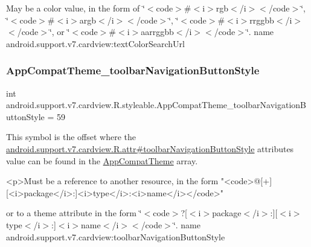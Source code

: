 May be a color value, in the form of \char`\"{}$<$code$>$\#$<$i$>$rgb$<$/i$>$$<$/code$>$\char`\"{}, \char`\"{}$<$code$>$\#$<$i$>$argb$<$/i$>$$<$/code$>$\char`\"{}, \char`\"{}$<$code$>$\#$<$i$>$rrggbb$<$/i$>$$<$/code$>$\char`\"{}, or \char`\"{}$<$code$>$\#$<$i$>$aarrggbb$<$/i$>$$<$/code$>$\char`\"{}.  name android.\+support.\+v7.\+cardview\+:text\+Color\+Search\+Url \mbox{\label{classandroid_1_1support_1_1v7_1_1cardview_1_1R_1_1styleable_a6ccca53fe196080e3926237eed8f3b67}} 
\subsubsection{\texorpdfstring{App\+Compat\+Theme\+\_\+toolbar\+Navigation\+Button\+Style}{AppCompatTheme\_toolbarNavigationButtonStyle}}
{\footnotesize\ttfamily int android.\+support.\+v7.\+cardview.\+R.\+styleable.\+App\+Compat\+Theme\+\_\+toolbar\+Navigation\+Button\+Style = 59\hspace{0.3cm}{\ttfamily [static]}}

This symbol is the offset where the \hyperlink{classandroid_1_1support_1_1v7_1_1cardview_1_1R_1_1attr_ae9cf75ca8aefa0117e4e6fddd9c56df2}{android.\+support.\+v7.\+cardview.\+R.\+attr\#toolbar\+Navigation\+Button\+Style} attribute\textquotesingle{}s value can be found in the \hyperlink{classandroid_1_1support_1_1v7_1_1cardview_1_1R_1_1styleable_a52e6f69f954ecc2622d72c0b4d298938}{App\+Compat\+Theme} array.

\begin{DoxyVerb}      <p>Must be a reference to another resource, in the form "<code>@[+][<i>package</i>:]<i>type</i>:<i>name</i></code>"
\end{DoxyVerb}
 or to a theme attribute in the form \char`\"{}$<$code$>$?\mbox{[}$<$i$>$package$<$/i$>$\+:\mbox{]}\mbox{[}$<$i$>$type$<$/i$>$\+:\mbox{]}$<$i$>$name$<$/i$>$$<$/code$>$\char`\"{}.  name android.\+support.\+v7.\+cardview\+:toolbar\+Navigation\+Button\+Style \mbox{\label{classandroid_1_1support_1_1v7_1_1cardview_1_1R_1_1styleable_ad3252ce0472f8a493dfefb321b238ec9}} 

